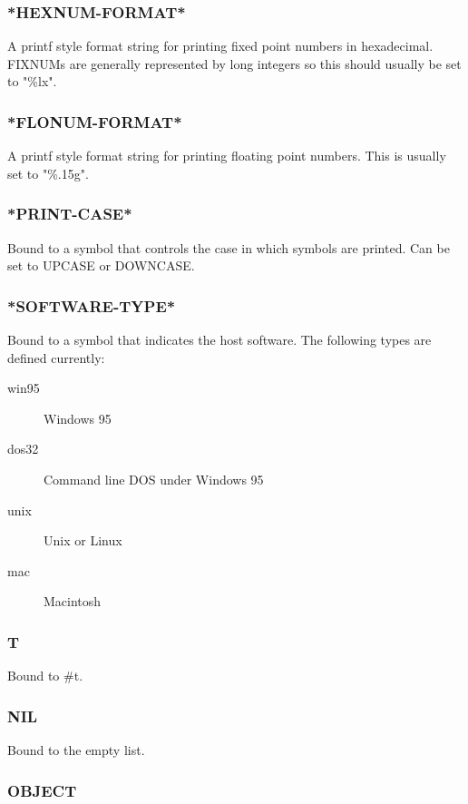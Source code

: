 \documentclass[11pt]{article}
\begin{document}
\subsubsection{\textrm{*HEXNUM-FORMAT*}}
\label{sec-4-2-10}

A printf style format string for printing fixed point numbers in
hexadecimal.  FIXNUMs are generally represented by long integers so
this should usually be set to "\%lx".
\subsubsection{\textrm{*FLONUM-FORMAT*}}
\label{sec-4-2-11}

A printf style format string for printing floating point numbers.
This is usually set to "\%.15g".
\subsubsection{\textrm{*PRINT-CASE*}}
\label{sec-4-2-12}

Bound to a symbol that controls the case in which symbols are
printed.  Can be set to UPCASE or DOWNCASE.
\subsubsection{\textrm{*SOFTWARE-TYPE*}}
\label{sec-4-2-13}

Bound to a symbol that indicates the host software.  The following
types are defined currently:

\begin{description}
\item[{win95}] Windows 95
\item[{dos32}] Command line DOS under Windows 95
\item[{unix}] Unix or Linux
\item[{mac}] Macintosh
\end{description}
\subsubsection{T}
\label{sec-4-2-14}

Bound to \#t.
\subsubsection{NIL}
\label{sec-4-2-15}

Bound to the empty list.
\subsubsection{OBJECT}
\label{sec-4-2-16}
\end{document}

